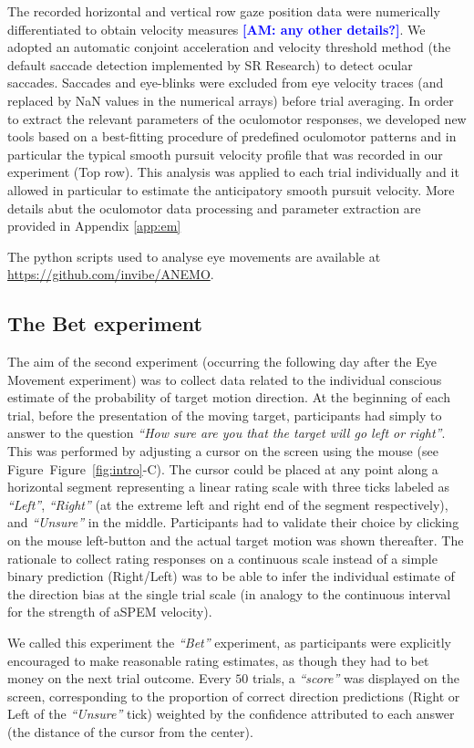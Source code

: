 \documentclass[12pt,english]{article}%
\newcommand{\seeFig}[1]{Figure~\ref{fig:#1}}
\newcommand{\AM}[1]{\textbf{\textcolor{blue}{[AM: #1]}}}
\begin{document}
The recorded horizontal and vertical row gaze position data were numerically differentiated to obtain velocity measures \AM{any other details?}. We adopted an automatic conjoint acceleration and velocity threshold method (the default saccade detection implemented by SR Research) to detect ocular saccades. Saccades and eye-blinks were excluded from eye velocity traces (and replaced by NaN values in the numerical arrays) before trial averaging.
In order to extract the relevant parameters of the oculomotor responses, we developed new tools based on a best-fitting procedure of predefined oculomotor patterns and in particular the typical smooth pursuit velocity profile that was recorded in our experiment (Top row). This analysis was applied to each trial individually and it allowed in particular to estimate the anticipatory smooth pursuit velocity. More details abut the oculomotor data processing and parameter extraction are provided in Appendix \ref{app:em}

The python scripts used to analyse eye movements are available at \url{https://github.com/invibe/ANEMO}.

\subsection{The Bet experiment}
The aim of the second experiment (occurring the following day after the Eye Movement experiment) was to collect data related to the individual conscious estimate of the probability of target motion direction. At the beginning of each trial, before the presentation of the moving target, participants had simply to answer to the question \textit{ ``How sure are you that the target will go left or right''}. This was performed by adjusting a cursor on the screen using the mouse (see Figure~\seeFig{intro}-C). The cursor could be placed at any point along a horizontal segment representing a linear rating scale with three ticks labeled as \textit{ ``Left''}, \textit{``Right''} (at the extreme left and right end of the segment respectively), and \textit{``Unsure''} in the middle. Participants had to validate their choice by clicking on the mouse left-button and the actual target motion was shown thereafter. The rationale to collect rating responses on a continuous scale instead of a simple binary prediction (Right/Left) was to be able to infer the individual estimate of the direction bias at the single trial scale (in analogy to the continuous interval for the strength of aSPEM velocity).

We called this experiment the \textit{ ``Bet''} experiment, as participants were explicitly encouraged to make reasonable rating estimates, as though they had to bet money on the next trial outcome. Every $50$ trials, a \textit{``score''} was displayed on the screen, corresponding to the proportion of correct direction predictions (Right or Left of the \textit{``Unsure''} tick) weighted by the confidence attributed to each answer (the distance of the cursor from the center).
\end{document}
